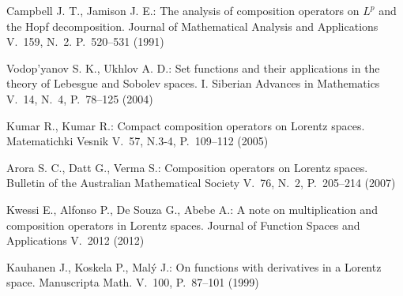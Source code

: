 \documentclass{birkjour}
\theoremstyle{definition}
\theoremstyle{remark}
\numberwithin{equation}{section}
\begin{document}
\begin{thebibliography}{1}
Campbell J. T., Jamison J. E.:
The analysis of composition operators on $L^p$ and the Hopf decomposition.
Journal of Mathematical Analysis and Applications V.~159, N.~2. P.~520--531 (1991) 

Vodop'yanov S. K., Ukhlov A. D.: 
Set functions and their applications in the theory of Lebesgue and Sobolev spaces. I.  
Siberian Advances in Mathematics V.~14, N.~4,  P.~78--125 (2004)


Kumar R., Kumar  R.:
Compact composition operators on Lorentz spaces.
Matematichki Vesnik V.~57, N.3-4, P.~109--112 (2005)

Arora S. C., Datt G., Verma S.:
Composition operators on Lorentz spaces.
 Bulletin of the Australian Mathematical Society V.~76, N.~2, P.~205--214 (2007)

Kwessi E., Alfonso P., De Souza G.,  Abebe A.:
A note on multiplication and composition operators in Lorentz spaces.
Journal of Function Spaces and Applications V.~2012 (2012)

Kauhanen J.,  Koskela P.,  Mal{\'y} J.:
On functions with derivatives in a Lorentz space. 
Manuscripta Math.  V.~100, P.~87--101 (1999)
\end{thebibliography}

\end{document}
